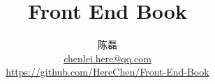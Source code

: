 \documentclass[12pt,a4paper]{article}
\begin{document}
\title{Front End Book}
\author{陈磊 \\ 
	\url{chenlei.here@qq.com} \\
	\url{https://github.com/HereChen/Front-End-Book}
}
\maketitle



\clearpage %

\begin{multicols}{2}
	\tableofcontents
\end{multicols}



% 
% 
% 
% 


% 


% 
% 
% 

% 
% 
\end{document}
